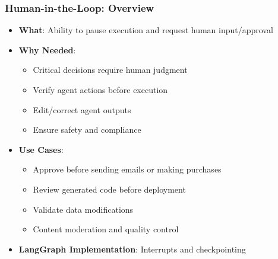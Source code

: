 \begin{frame}[fragile]\frametitle{Human-in-the-Loop: Overview}
      \begin{itemize}
        \item \textbf{What}: Ability to pause execution and request human input/approval
        \item \textbf{Why Needed}:
        \begin{itemize}
            \item Critical decisions require human judgment
            \item Verify agent actions before execution
            \item Edit/correct agent outputs
            \item Ensure safety and compliance
        \end{itemize}
        \item \textbf{Use Cases}:
        \begin{itemize}
            \item Approve before sending emails or making purchases
            \item Review generated code before deployment
            \item Validate data modifications
            \item Content moderation and quality control
        \end{itemize}
        \item \textbf{LangGraph Implementation}: Interrupts and checkpointing
      \end{itemize}
\end{frame}

